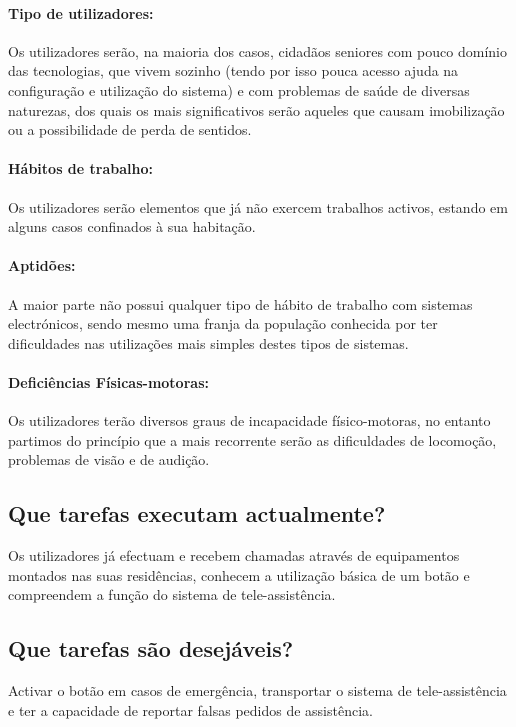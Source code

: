 \paragraph{Tipo de utilizadores:} Os utilizadores serão, na maioria dos casos, cidadãos seniores com pouco domínio das tecnologias, que vivem sozinho (tendo por isso pouca acesso ajuda na configuração e utilização do sistema) e com problemas de saúde de diversas naturezas, dos quais os mais significativos serão aqueles que causam imobilização ou a possibilidade de perda de sentidos.

\paragraph{Hábitos de trabalho:} Os utilizadores serão elementos que já não exercem trabalhos activos, estando em alguns casos confinados à sua habitação.

\paragraph{Aptidões:} A maior parte não possui qualquer tipo de hábito de trabalho com sistemas electrónicos, sendo mesmo uma franja da população conhecida por ter dificuldades nas utilizações mais simples destes tipos de sistemas.

\paragraph{Deficiências Físicas-motoras:} Os utilizadores terão diversos graus de incapacidade físico-motoras, no entanto partimos do princípio que a mais recorrente serão as dificuldades de locomoção, problemas de visão e de audição.


\subsection{Que tarefas executam actualmente?}
Os utilizadores já efectuam e recebem chamadas através de equipamentos montados nas suas residências, conhecem a utilização básica de um botão e compreendem a função do sistema de tele-assistência.

\subsection{Que tarefas são desejáveis?}
Activar o botão em casos de emergência, transportar o sistema de tele-assistência e ter a capacidade de reportar falsas pedidos de assistência.

